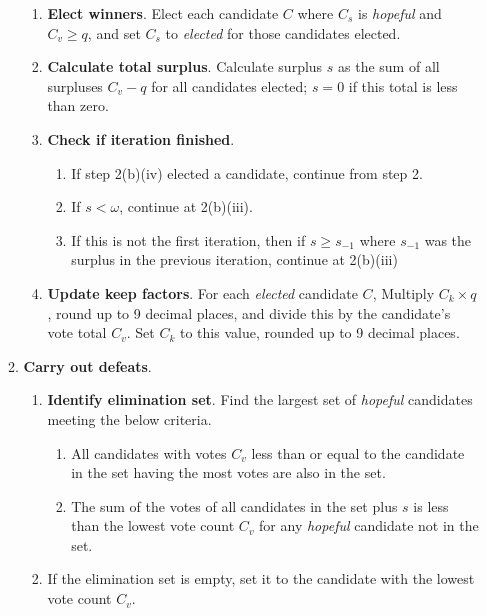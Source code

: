 \begin{enumerate}
\begin{enumerate}
\begin{enumerate}
            \item \textbf{Elect winners}.  Elect each candidate $C$ where $C_s$ is \textit{hopeful} and $C_v\geq q$, and set $C_s$ to \textit{elected} for those candidates elected.

            \item \textbf{Calculate total surplus}.  Calculate surplus $s$ as the sum of all surpluses $C_v - q$ for all candidates elected; $s=0$ if this total is less than zero.

            \item \textbf{Check if iteration finished}.
            \begin{enumerate}
                \item If step 2(b)(iv) elected a candidate, continue from step 2.

                \item If $s<\omega$, continue at 2(b)(iii).

                \item If this is not the first iteration, then if $s\geq s_{-1}$ where $s_{-1}$ was the surplus in the previous iteration, continue at 2(b)(iii)
            \end{enumerate}
            \item \textbf{Update keep factors}. For each \textit{elected} candidate $C$, Multiply $C_k\times q$, round up to 9 decimal places, and divide this by the candidate's vote total $C_v$.  Set $C_k$ to this value, rounded up to 9 decimal places.
        \end{enumerate}
        \item \textbf{Carry out defeats}.
        \begin{enumerate}
            \item \textbf{Identify elimination set}.  Find the largest set of \textit{hopeful} candidates meeting the below criteria.
            \begin{enumerate}
                \item All candidates with votes $C_v$ less than or equal to the candidate in the set having the most votes are also in the set.

                \item The sum of the votes of all candidates in the set plus $s$ is less than the lowest vote count $C_v$ for any \textit{hopeful} candidate not in the set.
            \end{enumerate}

            \item If the elimination set is empty, set it to the candidate with the lowest vote count $C_v$.


\end{enumerate}
\end{enumerate}
\end{enumerate}
